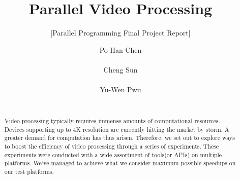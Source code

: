 \documentclass{acm_proc_article-sp}
\begin{document}
\title{Parallel Video Processing}
\subtitle{[Parallel Programming Final Project Report]
\titlenote{}}

\author{
\alignauthor
Po-Han Chen\titlenote{}\\
       \\
\alignauthor
Cheng Sun\titlenote{}\\
       \\
\alignauthor 
Yu-Wen Pwu\titlenote{}\\
       \\
}

\maketitle
\begin{abstract}
Video processing typically requires immense amounts of computational resources. Devices supporting up to 4K resolution are currently hitting the market by storm. A greater demand for computation has thus arisen. Therefore, we set out to explore ways to boost the efficiency of video processing through a series of experiments. These experiments were conducted with a wide assortment of tools(or APIs) on multiple platforms. We've managed to achieve what we consider maximum possible speedups on our test platforms. 
\end{abstract}
\end{document}
